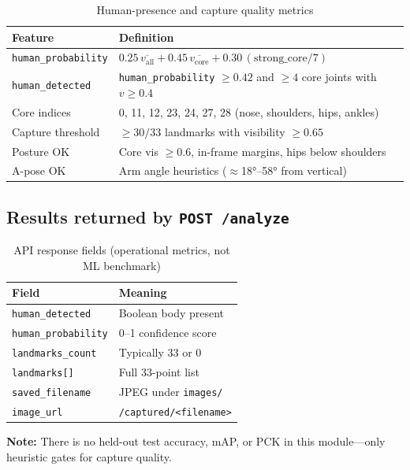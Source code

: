 \documentclass[a4paper,fleqn]{cas-sc}
\newcommand{\tblheadrow}{\rowcolor{tblhead}}
\begin{document}
\begin{table}[h]
\centering
\caption{Human-presence and capture quality metrics}
\label{tab:metrics}
\begin{tabularx}{\linewidth}{@{}lX@{}}
\tblheadrow
\textbf{Feature} & \textbf{Definition} \\
\midrule
\texttt{human\_probability} & $0.25\,\overline{v_{\mathrm{all}}} + 0.45\,\overline{v_{\mathrm{core}}} + 0.30\,(\mathrm{strong\_core}/7)$ \\
\texttt{human\_detected} & \texttt{human\_probability} $\geq 0.42$ and $\geq 4$ core joints with $v \geq 0.4$ \\
Core indices & 0, 11, 12, 23, 24, 27, 28 (nose, shoulders, hips, ankles) \\
Capture threshold & $\geq 30/33$ landmarks with visibility $\geq 0.65$ \\
Posture OK & Core vis $\geq 0.6$, in-frame margins, hips below shoulders \\
A-pose OK & Arm angle heuristics ($\approx$18°--58° from vertical) \\
\end{tabularx}
\end{table}

\subsection{Results returned by \texttt{POST /analyze}}

\begin{table}[h]
\centering
\caption{API response fields (operational metrics, not ML benchmark)}
\label{tab:api}
\begin{tabular}{@{}ll@{}}
\tblheadrow
\textbf{Field} & \textbf{Meaning} \\
\midrule
\texttt{human\_detected} & Boolean body present \\
\texttt{human\_probability} & 0--1 confidence score \\
\texttt{landmarks\_count} & Typically 33 or 0 \\
\texttt{landmarks[]} & Full 33-point list \\
\texttt{saved\_filename} & JPEG under \texttt{images/} \\
\texttt{image\_url} & \texttt{/captured/<filename>} \\
\end{tabular}
\end{table}

\textbf{Note:} There is no held-out test accuracy, mAP, or PCK in this module---only heuristic gates for capture quality.
\end{document}
